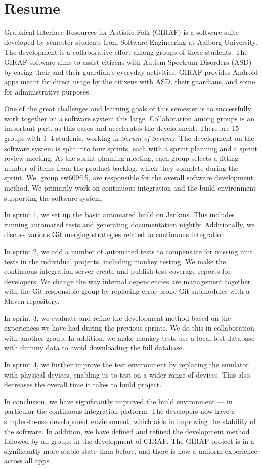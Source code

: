 \chapter*{Resume}
Graphical Interface Resources for Autistic Folk (GIRAF) is a software suite developed by  semester students from Software Engineering at Aalborg University. The development is a collaborative effort among groups of these students. The GIRAF software aims to assist citizens with Autism Spectrum Disorders (ASD) by easing their and their guardian's everyday activities. GIRAF provides Android apps meant for direct usage by the citizens with ASD, their guardians, and some for administrative purposes.

One of the great challenges and learning goals of this semester is to successfully work together on a software system this large. Collaboration among groups is an important part, as this eases and accelerates the development. There are 15 groups with 1--4 students, working in \emph{Scrum of Scrums}. The development on the software system is split into four sprints, each with a sprint planning and a sprint review meeting. At the sprint planning meeting, each group selects a fitting number of items from the product backlog, which they complete during the sprint. We, group sw609f15, are responsible for the overall software development method. We primarily work on continuous integration and the build environment supporting the software system.

In sprint 1, we set up the basic automated build on Jenkins. This includes running automated tests and generating documentation nightly. Additionally, we discuss various Git merging strategies related to continuous integration.

In sprint 2, we add a number of automated tests to compensate for missing unit tests in the individual projects, including monkey testing. We make the continuous integration server create and publish test coverage reports for developers. We change the way internal dependencies are management together with the Git-responsible group by replacing error-prone Git submodules with a Maven repository.

In sprint 3, we evaluate and refine the development method based on the experiences we have had during the previous sprints. We do this in collaboration with another group. In addition, we make monkey tests use a local test database with dummy data to avoid downloading the full database.

In sprint 4, we further improve the test environment by replacing the emulator with physical devices, enabling us to test on a wider range of devices. This also decreases the overall time it takes to build project.

In conclusion, we have significantly improved the build environment --- in particular the continuous integration platform. The developers now have a simpler-to-use development environment, which aids in improving the stability of the software. In addition, we have defined and refined the development method followed by all groups in the development of GIRAF. The GIRAF project is in a significantly more stable state than before, and there is now a uniform experience across all apps.

